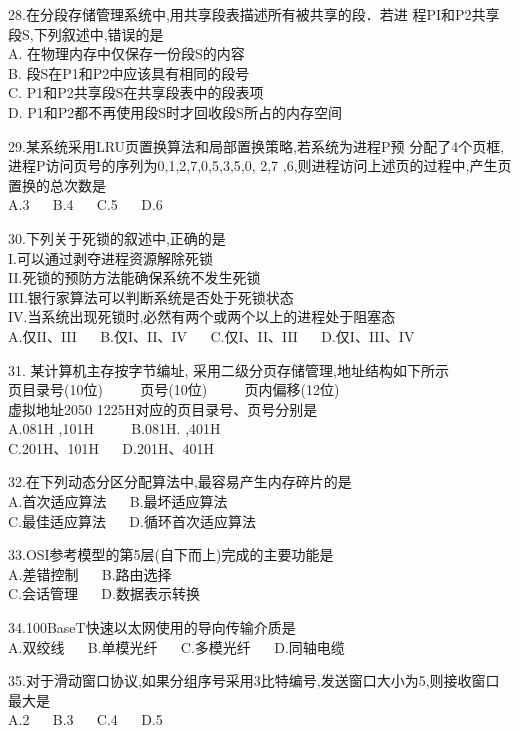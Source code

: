 28.在分段存储管理系统中,用共享段表描述所有被共享的段．若进
程PI和P2共享段S,下列叙述中,错误的是 \\
A. 在物理内存中仅保存一份段S的内容 \\
B. 段S在P1和P2中应该具有相同的段号 \\
C. P1和P2共享段S在共享段表中的段表项 \\
D. P1和P2都不再使用段S时才回收段S所占的内存空间

29.某系统采用LRU页置换算法和局部置换策略,若系统为进程P预
分配了4个页框,进程P访问页号的序列为0,1,2,7,0,5,3,5,0,
2,7 ,6,则进程访问上述页的过程中,产生页置换的总次数是 \\
A.3 $\quad$ B.4 $\quad$ C.5 $\quad$ D.6

30.下列关于死锁的叙述中,正确的是 \\
I.可以通过剥夺进程资源解除死锁 \\
II.死锁的预防方法能确保系统不发生死锁 \\
III.银行家算法可以判断系统是否处于死锁状态 \\
IV.当系统出现死锁时,必然有两个或两个以上的进程处于阻塞态 \\
A.仅II、III $\quad$ B.仅I、II、IV $\quad$ C.仅I、II、III $\quad$ D.仅I、III、IV

31. 某计算机主存按字节编址, 采用二级分页存储管理,地址结构如下所示 \\
页目录号(10位) $\qquad$ 页号(10位) $\qquad$ 页内偏移(12位) \\
虚拟地址2050 1225H对应的页目录号、页号分别是 \\
A.081H ,101H $\qquad$ B.081H. ,401H \\
C.201H、101H $\quad$ D.201H、401H

32.在下列动态分区分配算法中,最容易产生内存碎片的是 \\
A.首次适应算法 $\quad$ B.最坏适应算法 \\
C.最佳适应算法 $\quad$ D.循环首次适应算法

33.OSI参考模型的第5层(自下而上)完成的主要功能是 \\
A.差错控制 $\quad$ B.路由选择 \\
C.会话管理 $\quad$ D.数据表示转换

34.100BaseT快速以太网使用的导向传输介质是 \\
A.双绞线 $\quad$ B.单模光纤 $\quad$ C.多模光纤 $\quad$ D.同轴电缆

35.对于滑动窗口协议,如果分组序号采用3比特编号,发送窗口大小为5,则接收窗口最大是 \\
A.2 $\quad$ B.3 $\quad$ C.4 $\quad$ D.5

